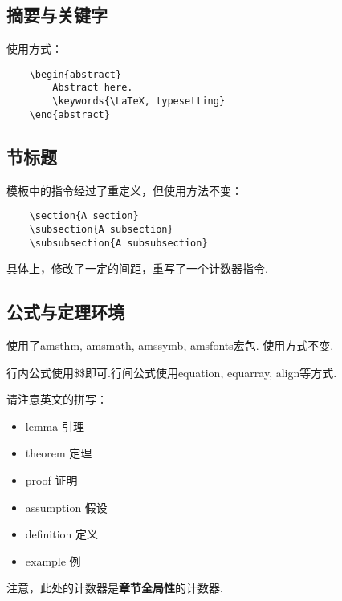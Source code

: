 \documentclass[bwprint, withouttitlepage, openfonts]{mathexpthesis}
\begin{document}
\subsection{摘要与关键字}
使用方式：
\begin{verbatim}
    \begin{abstract}
        Abstract here.
        \keywords{\LaTeX, typesetting}
    \end{abstract}
\end{verbatim}

\subsection{节标题}
模板中的指令经过了重定义，但使用方法不变：
\begin{verbatim}
    \section{A section}
    \subsection{A subsection}
    \subsubsection{A subsubsection}
\end{verbatim}

具体上，修改了一定的间距，重写了一个计数器指令.

\subsection{公式与定理环境}
使用了amsthm, amsmath, amssymb, amsfonts宏包. 使用方式不变.

行内公式使用\$\$即可.行间公式使用equation, equarray, align等方式.

请注意英文的拼写：
\begin{itemize}[itemindent=2em]
    \item lemma 引理
    \item theorem 定理
    \item proof 证明
    \item assumption 假设
    \item definition 定义
    \item example 例
\end{itemize}

注意，此处的计数器是\textbf{章节全局性}的计数器.
\end{document}
